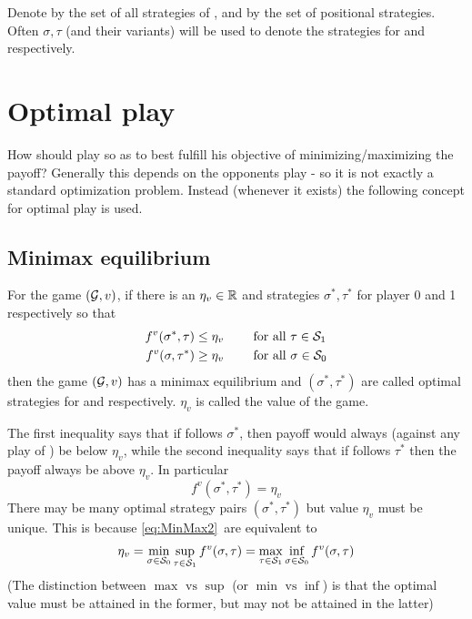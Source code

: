 Denote by  the set of all strategies of , and by  the set of positional strategies. Often $\sigma,\tau$ (and their variants) will be used to denote the strategies for  and  respectively.

\section{Optimal play}
How should  play so as to best fulfill his objective of minimizing/maximizing the payoff? Generally this depends on the opponents play - so it is not exactly a standard optimization problem. Instead (whenever it exists) the following concept for optimal play is used.
\subsection{Minimax equilibrium}
For the game $(\mathcal{G},v)$, if there is an $\eta_v \in \mathbb{R}$ and strategies $\sigma^*,\tau^*$ for player 0 and 1 respectively so that
\begin{equation}
\begin{aligned}
    f^v(\sigma^*,\tau) \leq \eta_v \qquad & \text{ for all } \tau \in \mathcal{S}_1 \\
    f^v(\sigma, \tau^*)  \geq \eta_v \qquad & \text{ for all } \sigma \in \mathcal{S}_0 
\end{aligned} \label{eq:MinMax2}
\end{equation}
\newcommand{\eqminmax}{\eqref{eq:MinMax2}\ }
then the game $(\mathcal{G},v)$ has a minimax equilibrium and $(\sigma^*,\tau^*)$ are called optimal strategies for  and  respectively. $\eta_v$ is called the value of the game.

The first inequality says that if  follows $\sigma^*$, then payoff would always (against any play of ) be below $\eta_v$, while the second inequality says that if  follows $\tau^*$ then the payoff always be above $\eta_v$. In particular
\[
    f^v(\sigma^*,\tau^*) = \eta_v
\]
There may be many optimal strategy pairs $(\sigma^*,\tau^*)$ but value $\eta_v$ must be unique. This is because
\eqminmax are equivalent to
\begin{align}
    \eta_v = \min_{\sigma \in \mathcal{S}_0} \sup_{\tau \in \mathcal{S}_1} f^v(\sigma, \tau) = \max_{\tau \in \mathcal{S}_1} \inf_{\sigma \in \mathcal{S}_0 } f^v(\sigma,\tau) \label{eq:MinMax}
\end{align}
(The distinction between $\max \text{ vs } \sup$ (or $\min \text{ vs } \inf$) is that the optimal value must be attained in the former, but may not be attained in the latter)

